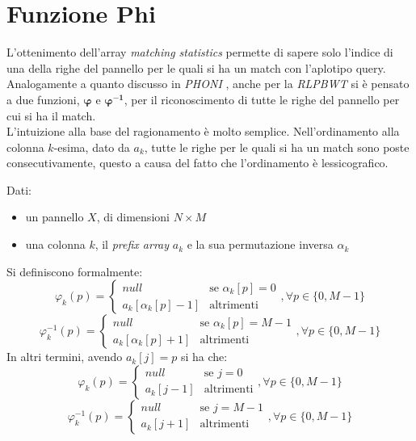 \section{Funzione Phi}
\label{secphi}
L'ottenimento dell'array \textit{matching statistics} permette di sapere solo
l'indice di una della righe del pannello per le quali si ha un match con
l'aplotipo query. Analogamente a quanto discusso in \textit{PHONI} \cite{phoni},
anche per la \textit{RLPBWT} si è pensato a due funzioni, $\boldsymbol\varphi$ e
$\boldsymbol\varphi\mathbf{^{-1}}$, per il riconoscimento di tutte le
righe del pannello per cui si ha il match.\\
L'intuizione alla base del ragionamento è molto semplice. Nell'ordinamento alla
colonna $k$-esima, dato da $a_k$, tutte le righe per le quali si ha un match
sono poste consecutivamente, questo a causa del fatto che l'ordinamento è
lessicografico.
\begin{definizione}
  Dati:
  \begin{itemize}
    \item un pannello $X$, di dimensioni $N\times M$
    \item una colonna $k$, il \textit{prefix array} $a_k$ e la sua permutazione
    inversa $\alpha_k$
  \end{itemize}
  Si definiscono formalmente:
  \[\varphi_k(p)=
    \begin{cases}
      null&\mbox{se }\alpha_k[p]=0\\
      a_k[\alpha_k[p]-1]&\mbox{altrimenti}
    \end{cases},\forall p\in\{0,M-1\}
  \]
  \[\varphi^{-1}_k(p)=
    \begin{cases}
      null&\mbox{se }\alpha_k[p]=M-1\\
      a_k[\alpha_k[p]+1]&\mbox{altrimenti}
    \end{cases},\forall p\in\{0,M-1\}
  \]
  In altri termini, avendo $a_k[j]=p$ si ha che:
  \[\varphi_k(p)=
    \begin{cases}
      null&\mbox{se }j=0\\
      a_k[j-1]&\mbox{altrimenti}
    \end{cases},\forall p\in\{0,M-1\}
  \]
  \[\varphi^{-1}_k(p)=
    \begin{cases}
      null&\mbox{se }j=M-1\\
      a_k[j+1]&\mbox{altrimenti}
    \end{cases},\forall p\in\{0,M-1\}
  \]
\end{definizione}
